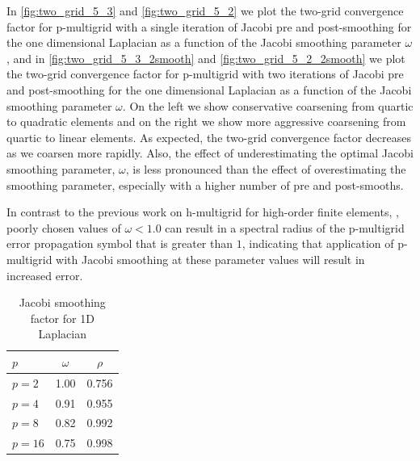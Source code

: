 \documentclass[review]{siamart190516}
\begin{document}
In \cref{fig:two_grid_5_3} and \cref{fig:two_grid_5_2} we plot the two-grid convergence factor for p-multigrid with a single iteration of Jacobi pre and post-smoothing for the one dimensional Laplacian as a function of the Jacobi smoothing parameter $\omega$,
and in \cref{fig:two_grid_5_3_2smooth} and \cref{fig:two_grid_5_2_2smooth} we plot the two-grid convergence factor for p-multigrid with two iterations of Jacobi pre and post-smoothing for the one dimensional Laplacian as a function of the Jacobi smoothing parameter $\omega$.
On the left we show conservative coarsening from quartic to quadratic elements and on the right we show more aggressive coarsening from quartic to linear elements.
As expected, the two-grid convergence factor decreases as we coarsen more rapidly.
Also, the effect of underestimating the optimal Jacobi smoothing parameter, $\omega$, is less pronounced than the effect of overestimating the smoothing parameter, especially with a higher number of pre and post-smooths.

In contrast to the previous work on h-multigrid for high-order finite elements, \cite{he2020two}, poorly chosen values of $\omega < 1.0$ can result in a spectral radius of the p-multigrid error propagation symbol that is greater than $1$, indicating that application of p-multigrid with Jacobi smoothing at these parameter values will result in increased error.

\begin{table}[ht!]
\begin{center}
\begin{tabular}{l c c}
  \toprule
  $p$       &  $\omega$   &  $\rho$  \\
  \midrule
  $p = 2$   &  1.00       &  0.756   \\
  $p = 4$   &  0.91       &  0.955   \\
  $p = 8$   &  0.82       &  0.992   \\
  $p = 16$  &  0.75       &  0.998   \\
  \bottomrule
\end{tabular}
\end{center}
\caption{Jacobi smoothing factor for 1D Laplacian}
\label{table:smoothing_factor_1d_jacobi}
\end{table}
\end{document}

